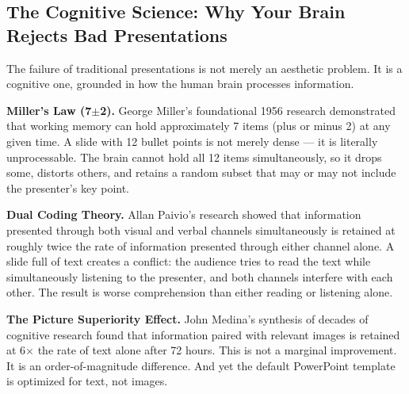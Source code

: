 \subsection{The Cognitive Science: Why Your Brain Rejects Bad Presentations}

The failure of traditional presentations is not merely an aesthetic problem. It is a cognitive one, grounded in how the human brain processes information.

\textbf{Miller's Law (7$\pm$2).} George Miller's foundational 1956 research demonstrated that working memory can hold approximately 7 items (plus or minus 2) at any given time. A slide with 12 bullet points is not merely dense --- it is literally unprocessable. The brain cannot hold all 12 items simultaneously, so it drops some, distorts others, and retains a random subset that may or may not include the presenter's key point.

\textbf{Dual Coding Theory.} Allan Paivio's research showed that information presented through both visual and verbal channels simultaneously is retained at roughly twice the rate of information presented through either channel alone. A slide full of text creates a conflict: the audience tries to read the text while simultaneously listening to the presenter, and both channels interfere with each other. The result is worse comprehension than either reading or listening alone.

\textbf{The Picture Superiority Effect.} John Medina's synthesis of decades of cognitive research found that information paired with relevant images is retained at 6$\times$ the rate of text alone after 72 hours. This is not a marginal improvement. It is an order-of-magnitude difference. And yet the default PowerPoint template is optimized for text, not images.


